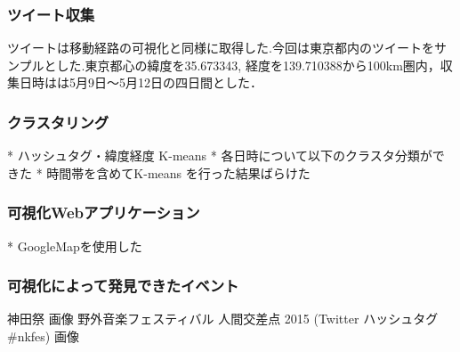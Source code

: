 \subsubsection{ツイート収集}
ツイートは移動経路の可視化と同様に取得した.今回は東京都内のツイートをサンプルとした.東京都心の緯度を35.673343, 経度を139.710388から100km圏内，収集日時はは5月9日〜5月12日の四日間とした．

\subsubsection{クラスタリング}
* ハッシュタグ・緯度経度 K-means
* 各日時について以下のクラスタ分類ができた
* 時間帯を含めてK-means を行った結果ばらけた


\subsubsection{可視化Webアプリケーション}
* GoogleMapを使用した


\subsubsection{可視化によって発見できたイベント}
神田祭 \cite{webpage_kanda} 画像
野外音楽フェスティバル 人間交差点 2015 (Twitter ハッシュタグ \#nkfes) \cite{webpage_nkfes} 画像

